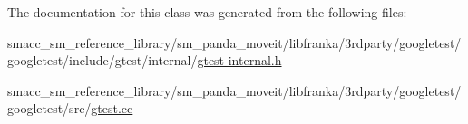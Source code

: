 The documentation for this class was generated from the following files\+:\begin{DoxyCompactItemize}
\item 
smacc\+\_\+sm\+\_\+reference\+\_\+library/sm\+\_\+panda\+\_\+moveit/libfranka/3rdparty/googletest/googletest/include/gtest/internal/\hyperlink{gtest-internal_8h}{gtest-\/internal.\+h}\item 
smacc\+\_\+sm\+\_\+reference\+\_\+library/sm\+\_\+panda\+\_\+moveit/libfranka/3rdparty/googletest/googletest/src/\hyperlink{gtest_8cc}{gtest.\+cc}\end{DoxyCompactItemize}
